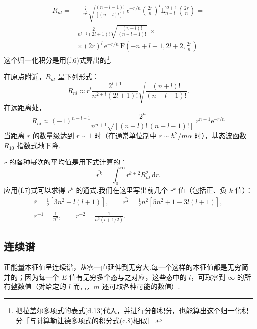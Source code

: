 \begin{equation}
\begin{aligned}
  R_{nl}={}&-\frac{2}{n^2}\sqrt{\frac{(n-l-1)!}{\left[(n+l)!\right]^3}}\,
  \mathrm{e}^{-r/n}\left(\frac{2r}{n}\right)^l\mathrm{L}_{n+l}^{2l+1}\left(\frac{2r}{n}\right)=\\
  ={}&\frac{2}{n^{l+2}(2l+1)!}\sqrt{\frac{(n+l)!}{(n-l-1)!}}\,\times\\
  &\times(2r)^l\,\mathrm{e}^{-r/n}\,
  \mathrm{F}\left(-n+l+1,2l+2,\frac{2r}{n}\right)
\end{aligned}
\end{equation}
这个归一化积分是用(f.6)式算出的\footnote{把拉盖尔多项式的表式(d.13)代入，并进行分部积分，也能算出这个归一化积分［与计算勒让德多项式的积分式(c.8)相似］.}.

在原点附近，$R_{nl}$ 呈下列形式：
\begin{equation}
  R_{nl}\approx r^l\frac{2^{l+1}}{n^{2+l}(2l+1)!}
  \sqrt{\frac{(n+l)!}{(n-l-1)!}}.
\end{equation}
在远距离处，
\begin{equation}
  R_{nl}\approx(-1)^{n-l-1}
  \frac{2^n}{n^{n+1}\sqrt{\left[(n+l)!\,(n-l-1)!\right]}}\,
  r^{n-1}\mathrm{e}^{-r/n}
\end{equation}
当距离 $r$ 的数量级达到 $r\sim1$ 时（在通常单位制中 $r\sim\hbar^2/m\alpha$ 时），基态波函数 $R_{10}$ 指数式地下降.

$r$ 的各种幂次的平均值是用下式计算的：
\begin{equation*}
  \overline{r^k}=\int_0^{\infty}r^{k+2}R_{nl}^2\,\mathrm{d}r.
\end{equation*}
应用(f.7)式可以求得 $\overline{r^k}$ 的通式.我们在这里写出前几个 $\overline{r^k}$ 值（包括正、负 $k$ 值）：
\begin{equation}
\begin{gathered}
  \overline{r}=\frac{1}{2}\left[3n^2-l(l+1)\right],\qquad
  \overline{r^2}=\frac{1}{2}n^2\left[5n^2+1-3l(l+1)\right],\\
  \overline{r^{-1}}=\frac{1}{n^2},\qquad
  \overline{r^{-2}}=\frac{1}{n^3(l+1/2)}.
\end{gathered}
\end{equation}

\subsection*{连续谱}

正能量本征值呈连续谱，从零一直延伸到无穷大.每一个这样的本征值都是无穷简并的；因为每一个 $E$ 值有无穷多个态与之对应，这些态中的 $l$，可取零到 $\infty$ 的所有整数值（对给定的 $l$ 而言，$m$ 还可取各种可能的数值）.

